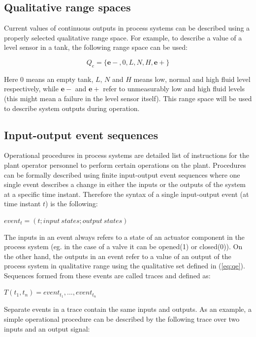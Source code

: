 \documentclass[conference]{IEEEtran}
\begin{document}
\subsection{Qualitative range spaces}
\label{sec:qualrngspc}
Current values of continuous outputs in process systems can be described using a properly selected qualitative range space. For example, to describe a value of a level sensor in a tank, the following range space can be used:

\begin{equation}
\label{eq:qe}
Q_e=\{\mathbf{e-},0,L,N,H,\mathbf{e+}\}
\end{equation}

Here $0$ means an empty tank, $L$, $N$ and $H$ means low, normal and high fluid level respectively, while $\mathbf{e-}$ and $\mathbf{e+}$ refer to unmeasurably low and high fluid levels (this might mean a failure in the level sensor itself). This range space will be used to describe system outputs during operation.

\subsection{Input-output event sequences}
\label{sec:ioseq}

Operational procedures in process systems are detailed list of instructions for the plant operator personnel to perform certain operations on the plant. Procedures can be formally described using finite input-output event sequences where one single event describes a change in either the inputs or the outputs of the system at a specific time instant. Therefore the syntax of a single input-output event (at time instant $t$) is the following:

$event_t=(t;{input~states};{output~states})$

The inputs in an event always refers to a state of an actuator component in the process system (eg. in the case of a valve it can be opened(1) or closed(0)). On the other hand, the outputs in an event refer to a value of an output of the process system in qualitative range using the qualitative set defined in (\ref{eq:qe}). Sequences formed from these events are called traces and defined as:

$T(t_1,t_n)={event_{t_1},...,event_{t_n}}$

Separate events in a trace contain the same inputs and outputs. As an example, a simple operational procedure can be described by the following trace over two inputs and an output signal:
\end{document}
